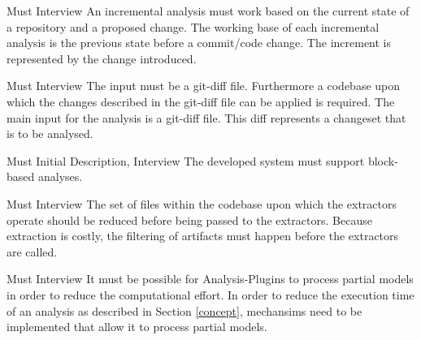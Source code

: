 \documentclass[a4paper]{article}
\begin{document}
\begin{req}
	\reqtable
	{Must}  {Interview}
	{An incremental analysis must work based on the current state of a repository and a proposed change. }
	{The working base of each incremental analysis is the previous state before a commit/code change. The increment is represented by the change introduced.}
	
	\begin{subreq} \label{req:git-diff}
		\reqtable
		{Must}  {Interview}
		{The input must be a git-diff file. Furthermore a codebase upon which the changes described in the git-diff file can be applied is required.}
		{The main input for the analysis is a git-diff file. This diff represents a changeset that is to be analysed.}
	\end{subreq}
\end{req}

\begin{req}\label{analysis-types}
	\reqtable
	{Must}  {Initial Description, Interview}
	{The developed system must support block-based analyses. }
	{}
	
\end{req}


\begin{req} \label{req:early-filtering}
\reqtable
	{Must}  {Interview}
	{The set of files within the codebase upon which the extractors operate should be reduced before being passed to the extractors.}
	{Because extraction is costly, the filtering of artifacts must happen before the extractors are called.}
\end{req}

\begin{req} \label{req:early-filtering}
\reqtable
	{Must}  {Interview}
	{It must be possible for Analysis-Plugins to process partial models in order to reduce the computational effort.}
	{In order to reduce the execution time of an analysis as described in Section \ref{concept}, mechansims need to be implemented that allow it to process partial models.}
\end{req}
\end{document}

